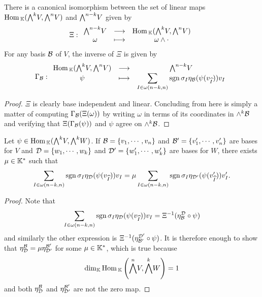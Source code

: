 \begin{proposition}\label{CanonicalIso}
There is a canonical isomorphism between the set of linear maps $\Hom_\K(\bw V,\bw[n]V)$ and $\bw[n-k]V$ given by
\[\Xi:\funcDef{\bw[n-k]V}{\Hom_\K(\bw V, \bw[n]V)}{\omega}{\omega\wedge \cdot}\]
For any basis $\mathcal{B}$ of $V$, the inverse of $\Xi$ is given by 
\[\Gamma_\Bc:\funcDef{\Hom_\K(\bw V,\bw[n]V)}{\bw[n-k]V}{\psi}{\displaystyle \sum_{I\in\omega(n-k,n)}\sgn\sigma_I\eta_\Bc(\psi(v_{\wh I}))v_I}\]
\end{proposition}
\begin{proof}
$\Xi$ is clearly base independent and linear. Concluding from here is simply a matter of computing $\Gamma_{\mathcal{B}}(\Xi(\omega))$ by writing $\omega$ in terms of its coordinates in $\wedge^k\mathcal{B}$ and verifying that $\Xi(\Gamma_{\mathcal{B}}(\psi))$ and $\psi$ agree on $\wedge^k\mathcal{B}$.
\end{proof}
\begin{corollary}\label{UpToScalarCanonicalIso}
Let $\psi\in \Hom_\K(\bw V,\bw W)$. If $\mathcal{B}=\left\{{v_1,\cdots, v_n}\right\}$ and $\mathcal{B}'=\left\{{v_1',\cdots, v_n'}\right\}$ are bases for $V$ and $\mathcal{D}=\left\{{w_1,\cdots,w_k}\right\}$ and $\mathcal{D}'=\left\{{w_1',\cdots,w_k'}\right\}$ are bases for $W$, there exists $\mu\in\mathbb{K}^\ast$ such that
\[\sum_{I\in\omega(n-k,n)}\mathrm{sgn}\,\sigma_I\eta_{\mathcal{D}}(\psi(v_{\widehat{I}}))v_I=\mu \sum_{I\in\omega(n-k,n)}\mathrm{sgn}\,\sigma_I\eta_{\mathcal{D}'}(\psi(v'_{\widehat{I}}))v'_I.\]
\end{corollary}
\begin{proof}
Note that
\[\sum_{I\in\omega(n-k,n)}\mathrm{sgn}\,\sigma_I\eta_{\mathcal{D}}(\psi(v_{\widehat{I}}))v_I=\Xi^{-1}(\eta^{\mathcal{D}}_{\mathcal{B}}\circ \psi)\]
and similarly the other expression is $\Xi^{-1}(\eta^{\mathcal{D}'}_{\mathcal{B}'}\circ \psi)$. 
It is therefore enough to show that $\eta^{\mathcal{B}}_{\mathcal{D}}=\mu\eta^{\mathcal{B}'}_{\mathcal{D}'}$ for some $\mu\in \mathbb{K}^\ast$, which is true because 
\[\dim_\K\Hom_\K\pa{\bw[n]V,\bw W}=1\] 
and both $\eta^{\mathcal{B}}_{\mathcal{D}}$ and $\eta^{\mathcal{B}'}_{\mathcal{D}'}$ are not the zero map.
\end{proof}





